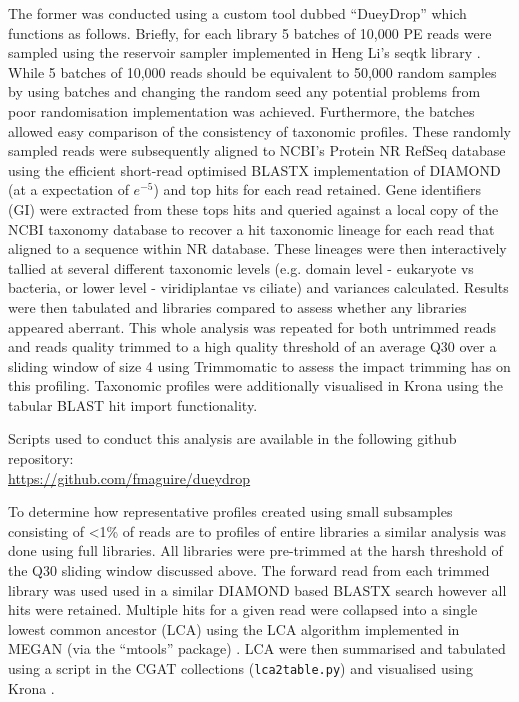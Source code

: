 The former was conducted using a custom tool dubbed ``DueyDrop'' which functions as follows.
Briefly, for each library 5 batches of 10,000 PE reads were sampled 
using the reservoir sampler \citep{Vitter1985} implemented in Heng Li's seqtk library \citep{SeqtkGitHub}. While 5 batches of 10,000 reads should be equivalent to 50,000 random samples by using batches and changing the random seed any potential problems from poor randomisation implementation was achieved.  Furthermore, the batches allowed easy comparison of the consistency of taxonomic profiles.
These randomly sampled reads were subsequently aligned to NCBI's Protein NR RefSeq database \citep{Pruitt2007}
using the efficient short-read optimised BLASTX implementation of DIAMOND \citep{Buchfink2015} (at a expectation
    of \(e^{-5}\)) and top hits for each read retained.  Gene identifiers (GI) were extracted from these tops hits and queried against a
local copy of the NCBI taxonomy database \citep{Federhen2012} to recover a hit taxonomic lineage for each
read that aligned to a sequence within NR database. These lineages were then interactively tallied 
at several different taxonomic levels (e.g. domain level - eukaryote vs bacteria, or lower level - viridiplantae vs ciliate) and variances
calculated.  Results were then tabulated and libraries compared to assess whether any libraries appeared
aberrant.  This whole analysis was repeated for both untrimmed reads and reads quality trimmed
to a high quality threshold of an average Q30 over a sliding window of size 4 using
Trimmomatic \citep{Bolger2014a} to assess the impact trimming has on this profiling.
Taxonomic profiles were additionally visualised in Krona \citep{Ondov2011} using
the tabular BLAST hit import functionality.

Scripts used to conduct this analysis are available in the following github repository:\\
\url{https://github.com/fmaguire/dueydrop}

To determine how representative profiles created using small subsamples 
consisting of <1\% of reads are to profiles of entire libraries a similar analysis
was done using full libraries. All libraries were pre-trimmed at the harsh
threshold of the Q30 sliding window discussed above. 
The forward read from each trimmed library was used 
used in a similar DIAMOND based BLASTX search however all hits were retained.
Multiple hits for a given read were collapsed 
into a single lowest common ancestor (LCA) using the LCA algorithm \citep{Gabow1985} implemented in MEGAN (via the ``mtools''
package) \citep{Huson2007,el2013improved}.  LCA were then summarised and tabulated using
a script in the CGAT collections (\texttt{lca2table.py}) \citep{Sims2014} and visualised 
using Krona \citep{Ondov2011}.

